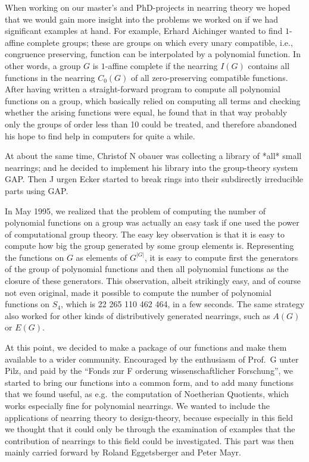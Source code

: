 
\begingroup
\def\"#1{\accent127 #1}

When working on our master's and PhD-projects in nearring theory
we hoped that we would gain more insight into the problems we worked on if
we had significant examples at hand.
For example, Erhard Aichinger wanted to find $1$-affine complete groups;
these are groups on which every unary compatible, i.e., congruence preserving, 
function
can be interpolated by a polynomial function. In other words,
a group $G$ is $1$-affine complete if the nearring $I(G)$ 
contains all functions in the nearring $C_0 (G)$ of all
zero-preserving compatible functions. 
After having written a straight-forward program to compute
all polynomial  functions on a group, which basically relied on
computing all terms and checking whether the arising functions were
equal, he found that in that way probably only the groups of
order less than 10 could be treated, and therefore abandoned
his hope to find help in computers for quite a while.

At about the same time, Christof N\"obauer was collecting a library
of *all* small nearrings; and he decided to implement his library 
into
the group-theory system GAP. Then J\"urgen Ecker started to
break rings into their subdirectly irreducible parts using GAP.

In May 1995, we realized that the problem of computing the
number of polynomial functions on a group was actually an easy
task if one used the power of computational group theory.
The easy key observation is that it is easy to compute
how big the group generated by some group elements is.
Representing the functions on $G$ as elements of $G^{|G|}$,
it is easy to compute first the generators of the group
of polynomial functions and then all polynomial functions
as the closure of these generators. This observation, albeit
strikingly easy, and of course not even original, made it 
possible to compute the number of polynomial functions on
$S_4$, which is 22 265 110 462 464, in a few seconds.
The same strategy also worked for other kinds of distributively
generated nearrings, such as $A(G)$ or $E(G)$.

At this point, we decided to make a package of our functions and
make them available to a wider community. Encouraged
by the enthusiasm of Prof.~G\"unter Pilz, and paid by 
the ``Fonds zur F\"orderung wissenschaftlicher Forschung'', we
started to bring our functions into a common form, and to
add many functions that we found useful, as e.g.\ the
computation of Noetherian Quotients, which works especially
fine for polynomial nearrings. 
We wanted to include the applications of nearring theory
to design-theory, because especially in this
field we thought that it could only be through the examination of
examples that the contribution of nearrings to this
field could be investigated. This part was then mainly carried
forward by Roland Eggetsberger and Peter Mayr. 

